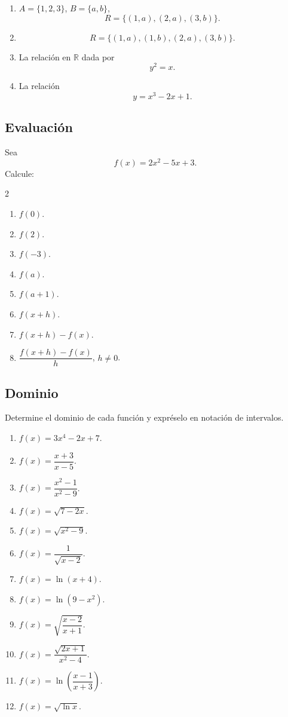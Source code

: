\documentclass[12pt]{article}
\theoremstyle{remark}
\newcommand{\R}{\mathbb{R}}
\begin{document}
\begin{enumerate}
    \item $A=\{1,2,3\}$, $B=\{a,b\}$,
    \[
    R=\{(1,a),(2,a),(3,b)\}.
    \]
    \item
    \[
    R=\{(1,a),(1,b),(2,a),(3,b)\}.
    \]
    \item La relación en $\R$ dada por
    \[
    y^2=x.
    \]
    \item La relación
    \[
    y=x^3-2x+1.
    \]
\end{enumerate}

\subsection{Evaluación}

Sea
\[
f(x)=2x^2-5x+3.
\]
Calcule:
\begin{multicols}{2}
\begin{enumerate}
    \item $f(0)$.
    \item $f(2)$.
    \item $f(-3)$.
    \item $f(a)$.
    \item $f(a+1)$.
    \item $f(x+h)$.
    \item $f(x+h)-f(x)$.
    \item $\dfrac{f(x+h)-f(x)}{h}$, $h\neq0$.
\end{enumerate}
\end{multicols}

\subsection{Dominio}

Determine el dominio de cada función y expréselo en notación de intervalos.

\begin{enumerate}
    \item $f(x)=3x^4-2x+7$.
    \item $f(x)=\dfrac{x+3}{x-5}$.
    \item $f(x)=\dfrac{x^2-1}{x^2-9}$.
    \item $f(x)=\sqrt{7-2x}$.
    \item $f(x)=\sqrt{x^2-9}$.
    \item $f(x)=\dfrac{1}{\sqrt{x-2}}$.
    \item $f(x)=\ln(x+4)$.
    \item $f(x)=\ln(9-x^2)$.
    \item $f(x)=\sqrt{\dfrac{x-2}{x+1}}$.
    \item $f(x)=\dfrac{\sqrt{2x+1}}{x^2-4}$.
    \item $f(x)=\ln\left(\dfrac{x-1}{x+3}\right)$.
    \item $f(x)=\sqrt{\ln x}$.
\end{enumerate}
\end{document}
